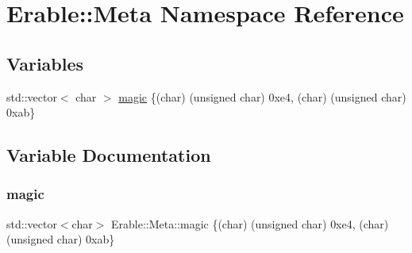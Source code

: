 \hypertarget{namespace_erable_1_1_meta}{}\section{Erable\+::Meta Namespace Reference}
\label{namespace_erable_1_1_meta}
\subsection*{Variables}
\begin{DoxyCompactItemize}
\item 
std\+::vector$<$ char $>$ \mbox{\hyperlink{namespace_erable_1_1_meta_ae5a91d31258f24eab431ccb83c5d2251}{magic}} \{(char) (unsigned char) 0xe4, (char) (unsigned char) 0xab\}
\end{DoxyCompactItemize}


\subsection{Variable Documentation}
\mbox{\label{namespace_erable_1_1_meta_ae5a91d31258f24eab431ccb83c5d2251}} 
\subsubsection{\texorpdfstring{magic}{magic}}
{\footnotesize\ttfamily std\+::vector$<$char$>$ Erable\+::\+Meta\+::magic \{(char) (unsigned char) 0xe4, (char) (unsigned char) 0xab\}}

